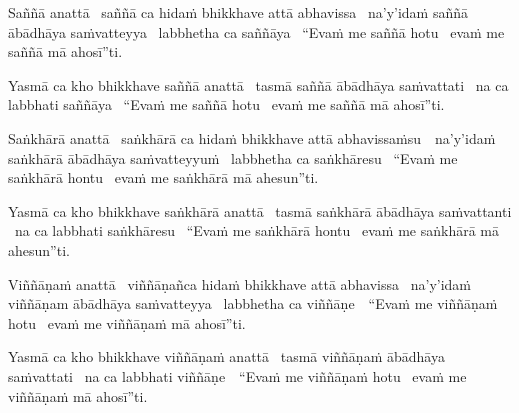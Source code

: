 \begin{pali-hang}
  Saññā anattā \breathmark\ saññā ca hidaṁ bhikkhave attā abhavissa \breathmark\ na'y'idaṁ saññā ābādhāya saṁvatteyya \breathmark\ labbhetha ca saññāya \breathmark\ ``Evaṁ me saññā hotu \breathmark\ evaṁ me saññā mā ahosī''ti.
\end{pali-hang}
\begin{pali-hangtogether}
  Yasmā ca kho bhikkhave saññā anattā \breathmark\ tasmā saññā ābādhāya saṁvattati \breathmark\ na ca labbhati saññāya \breathmark\ ``Evaṁ me saññā hotu \breathmark\ evaṁ me saññā mā ahosī''ti.
\end{pali-hangtogether}

\begin{pali-hang}
  Saṅkhārā anattā \breathmark\ saṅkhārā ca hidaṁ bhikkhave attā \mbox{abhavissaṁsu}~\breathmark\ na'y'idaṁ saṅkhārā ābādhāya saṁvatteyyuṁ \breathmark\ labbhetha ca saṅkhāresu \breathmark\ ``Evaṁ me saṅkhārā hontu \breathmark\ evaṁ me saṅkhārā mā ahesun''ti.
\end{pali-hang}
\begin{pali-hangtogether}
  Yasmā ca kho bhikkhave saṅkhārā anattā \breathmark\ tasmā saṅkhārā ābādhāya saṁvattanti \breathmark\ na ca labbhati saṅkhāresu \breathmark\ ``Evaṁ me saṅkhārā hontu \breathmark\ evaṁ me saṅkhārā mā ahesun''ti.
\end{pali-hangtogether}

\begin{pali-hang}
  Viññāṇaṁ anattā \breathmark\ viññāṇañca hidaṁ bhikkhave attā abhavissa \breathmark\ na'y'idaṁ viññāṇam ābādhāya saṁvatteyya \breathmark\ labbhetha ca \mbox{viññāṇe}~\breathmark\ ``Evaṁ me viññāṇaṁ hotu \breathmark\ evaṁ me viññāṇaṁ mā ahosī''ti.
\end{pali-hang}
\begin{pali-hangtogether}
  Yasmā ca kho bhikkhave viññāṇaṁ anattā \breathmark\ tasmā viññāṇaṁ ābādhāya saṁvattati \breathmark\ na ca labbhati \mbox{viññāṇe}~\breathmark\ ``Evaṁ me viññāṇaṁ hotu \breathmark\ evaṁ me viññāṇaṁ mā ahosī''ti.
\end{pali-hangtogether}

